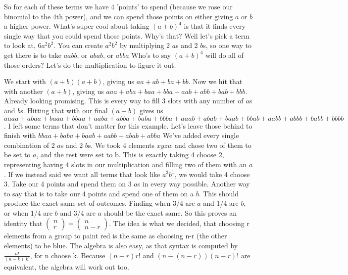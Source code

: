 \documentclass{article}
\begin{document}
    So for each of these terms we have 4 'points' to spend (because we rose our binomial to the 4th power), and we can spend those points on either giving $a$ or $b$ a higher power.
    What's super cool about taking $(a+b)^4$ is that it finds every single way that you could spend those points.
    Why's that?
    Well let's pick a term to look at, $6a^2b^2$.
    You can create $a^2b^2$ by multiplying 2 $a$s and 2 $b$s,
    so one way to get there is to take $aabb$, or $abab$, or $abba$
    Who's to say $(a+b)^4$ will do all of those orders?
    Let's do the multiplication to figure it out.

    We start with $(a+b)(a+b)$, giving us $aa + ab + ba + bb$.
    Now we hit that with another $(a+b)$, giving us
    $aaa + aba + baa + bba + aab + abb + bab + bbb$.
    Already looking promising. 
    This is every way to fill 3 slots with any number of $a$s and $b$s.
    Hitting that with our final $(a+b)$ gives us
    $aaaa + abaa + baaa + bbaa + aaba + abba + baba + bbba + aaab + abab + baab + bbab + aabb + abbb + babb + bbbb$.
    I left some terms that don't matter for this example.
    Let's leave those behind to finish with
    $bbaa + baba + baab + aabb + abab + abba$
    We've added every single combination of 2 $a$s and 2 $b$s.
    We took 4 elements $xyzw$ and chose two of them to be set to $a$, and the rest were set to b.
    This is exactly taking 4 choose 2, representing having 4 slots in our multiplication and filling two of them with an $a$.
    If we instead said we want all terms that look like $a^3b^1$, we would take 4 choose 3.
    Take our 4 points and spend them on 3 $a$s in every way possible.
    Another way to say that is to take our 4 points and spend one of them on a $b$.
    This should produce the exact same set of outcomes.
    Finding when 3/4 are $a$ and 1/4 are $b$, or when 1/4 are $b$ and 3/4 are $a$ should be the exact same.
    So this proves an identity that 
    $\left( \begin{matrix}
        n\\
        r
    \end{matrix}\right) = \left( \begin{matrix}
        n\\
        n-r
    \end{matrix} \right)$.
    The idea is what we decided, that choosing r elements from a group to paint red is the same as choosing n-r (the other elements) to be blue.
    The algebra is also easy, as that syntax is computed by 
    $\frac{n!}{(n-k)!k!}$, for n choose k.
    Because $(n-r)r!$ and $(n-(n-r))(n-r)!$ are equivalent, the algebra will work out too. 
\end{document}
